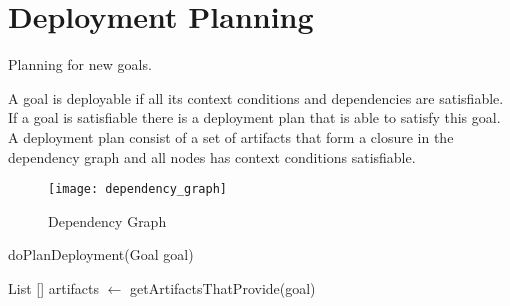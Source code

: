 \section{Deployment Planning}
\label{sec:deployment_planning}

Planning for new goals.

A goal is deployable if all its context conditions and dependencies are satisfiable. If a goal is satisfiable there is a deployment plan that is able to satisfy this goal. A deployment plan consist of a set of artifacts that form a closure in the dependency graph and all nodes has context conditions satisfiable.

\begin{figure}[!htb]
  \centering
  \texttt{[image: dependency\_graph]}
  \caption{Dependency Graph}
  \label{fig:dependency_graph}
\end{figure}

\begin{algorithm}
 \caption{doPlanDeployment(Goal goal)}
 \label{alg:deployment_plan}

 List [] artifacts $\leftarrow$ getArtifactsThatProvide(goal)\;
\end{algorithm}
